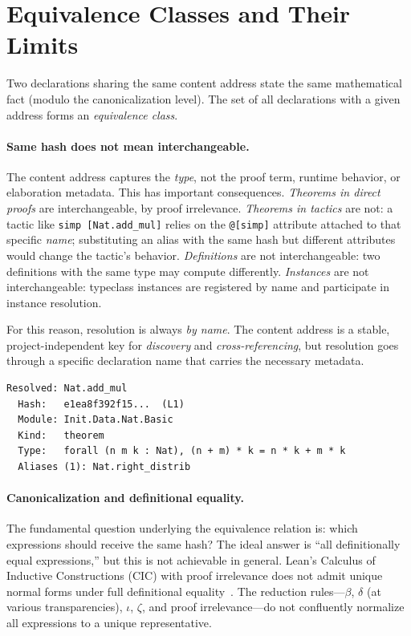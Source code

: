 \section{Equivalence Classes and Their Limits}
\label{sec:equiv}

Two declarations sharing the same content address state the same
mathematical fact (modulo the canonicalization level).  The set of all
declarations with a given address forms an \emph{equivalence class}.

\paragraph{Same hash does not mean interchangeable.}  The content
address captures the \emph{type}, not the proof term, runtime behavior,
or elaboration metadata.  This has important consequences.
\emph{Theorems in direct proofs} are interchangeable, by proof
irrelevance.  \emph{Theorems in tactics} are not: a tactic like
\texttt{simp [Nat.add\_mul]} relies on the \texttt{@[simp]} attribute
attached to that specific \emph{name}; substituting an alias with the
same hash but different attributes would change the tactic's behavior.
\emph{Definitions} are not interchangeable: two definitions with the
same type may compute differently.  \emph{Instances} are not
interchangeable: typeclass instances are registered by name and
participate in instance resolution.

For this reason, resolution is always \emph{by name}.  The content
address is a stable, project-independent key for \emph{discovery} and
\emph{cross-referencing}, but resolution goes through a specific
declaration name that carries the necessary metadata.

\begin{lstlisting}[style=output,caption={Alias discovery via content address}]
Resolved: Nat.add_mul
  Hash:   e1ea8f392f15...  (L1)
  Module: Init.Data.Nat.Basic
  Kind:   theorem
  Type:   forall (n m k : Nat), (n + m) * k = n * k + m * k
  Aliases (1): Nat.right_distrib
\end{lstlisting}


\paragraph{Canonicalization and definitional equality.}
The fundamental question underlying the equivalence relation is: which
expressions should receive the same hash?  The ideal answer is ``all
definitionally equal expressions,'' but this is not achievable in
general.  Lean's Calculus of Inductive Constructions (CIC) with proof
irrelevance does not admit unique normal forms under full definitional
equality~\cite{abel2018decidability, coquand1991algorithm}.  The
reduction rules---$\beta$, $\delta$ (at various transparencies),
$\iota$, $\zeta$, and proof irrelevance---do not confluently normalize
all expressions to a unique representative.


